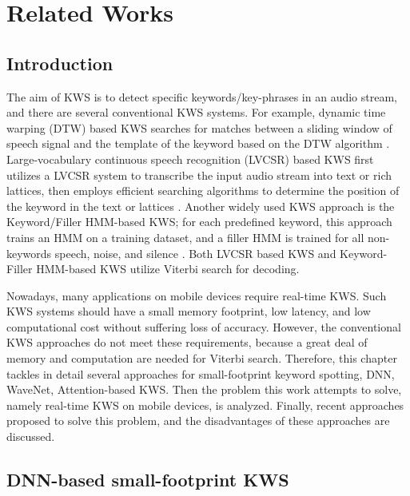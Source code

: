 \chapter{Related Works} \label{chap:related_works}

    \section{Introduction}\label{sec:related_intro}

        The aim of KWS is to detect specific keywords/key-phrases in an audio stream, and there are several conventional KWS systems.
        For example, dynamic time warping (DTW) based KWS searches for matches between a sliding window of speech signal and the template of the keyword based on the DTW algorithm \cite{SC78}.
        Large-vocabulary continuous speech recognition (LVCSR) based KWS first utilizes a LVCSR system to transcribe the input audio stream into text or rich lattices, then employs efficient searching algorithms to determine the position of the keyword in the text or lattices \cite{GAV00,MKK+07}.
        Another widely used KWS approach is the Keyword/Filler HMM-based KWS; for each predefined keyword, this approach trains an HMM on a training dataset, and a filler HMM is trained for all non-keywords speech, noise, and silence \cite{RRRG89,RP90,WMM91}.
        Both LVCSR based KWS and Keyword-Filler HMM-based KWS utilize Viterbi search for decoding.\

        Nowadays, many applications on mobile devices require real-time KWS. 
        Such KWS systems should have a small memory footprint, low latency, and low computational cost without suffering loss of accuracy. 
        However, the conventional KWS approaches do not meet these requirements, because a great deal of memory and computation are needed for Viterbi search.
        Therefore, this chapter tackles in detail several approaches for small-footprint keyword spotting, DNN, WaveNet, Attention-based KWS. 
        Then the problem this work attempts to solve, namely real-time KWS on mobile devices, is analyzed.
        Finally, recent approaches proposed to solve this problem, and the disadvantages of these approaches are discussed. 

    \section{DNN-based small-footprint KWS} \label{sec:related_dnn}

